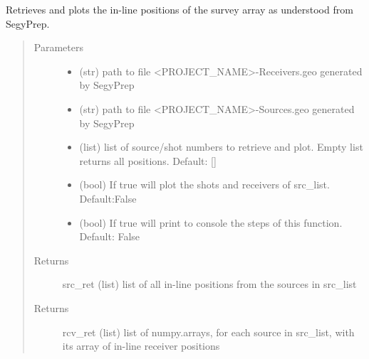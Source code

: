 \documentclass[letterpaper,10pt,english]{sphinxmanual}
\begin{document}
\begin{fulllineitems}
\label{\detokenize{index:fullwaveqc.geom.surveygeom}}
Retrieves and plots the in-line positions of the survey array as understood from SegyPrep.
\begin{quote}\begin{description}
\item[{Parameters}] \leavevmode\begin{itemize}
\item {} 
 \textendash{} (str)  path to file \textless{}PROJECT\_NAME\textgreater{}-Receivers.geo generated by SegyPrep

\item {} 
 \textendash{} (str)  path to file \textless{}PROJECT\_NAME\textgreater{}-Sources.geo generated by SegyPrep

\item {} 
 \textendash{} (list) list of source/shot numbers to retrieve and plot. Empty list returns
all positions. Default: {[}{]}

\item {} 
 \textendash{} (bool) If true will plot the shots and receivers of src\_list. Default:False

\item {} 
 \textendash{} (bool) If true will print to console the steps of this function. Default: False

\end{itemize}

\item[{Returns}] \leavevmode
src\_ret     (list) list of all in-line positions from the sources in src\_list

\item[{Returns}] \leavevmode
rcv\_ret     (list) list of numpy.arrays, for each source in src\_list, with its array of in-line
receiver positions

\end{description}\end{quote}

\end{fulllineitems}
\end{document}
